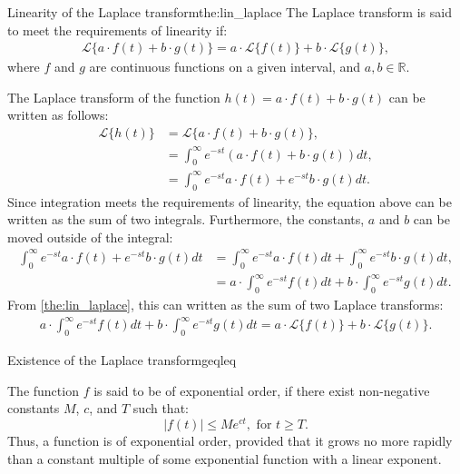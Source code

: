 \begin{theorem}{Linearity of the Laplace transform}{the:lin_laplace}
The Laplace transform is said to meet the requirements of linearity if:
\begin{align*}
\mathcal{L}\{a\cdot f(t)+b\cdot g(t)\}=a\cdot \mathcal{L}\{f(t)\}+b\cdot \mathcal{L}\{g(t)\},
\end{align*}
where $f$ and $g$ are continuous functions on a given interval, and $a, b \in \mathbb{R}$.
\end{theorem}
\begin{prof}{}{}
The Laplace transform of the function $h(t)=a\cdot f(t)+ b \cdot g(t)$ can be written as follows:
\begin{align*}
\mathcal{L}\{h(t)\}&=\mathcal{L}\{a\cdot f(t)+b\cdot g(t)\},
\\
&=\int_{0}^\infty e^{-st}\left(a\cdot f(t)+b\cdot g(t)\right)dt,
\\
&=\int_{0}^\infty e^{-st}a\cdot f(t)+e^{-st}b\cdot g(t)dt.
\end{align*}
Since integration meets the requirements of linearity, the equation above can be written as the sum of two integrals. Furthermore, the constants, $a$ and $b$ can be moved outside of the integral:
\begin{align*}
\int_{0}^\infty e^{-st}a\cdot f(t)+e^{-st}b\cdot g(t)dt &=\int_{0}^\infty e^{-st}a\cdot f(t)dt+\int_{0}^\infty e^{-st}b\cdot g(t)dt,
\\
&= a\cdot \int_{0}^\infty e^{-st} f(t)dt+ b \cdot \int_{0}^\infty e^{-st} g(t)dt.
\end{align*}
From \cref{the:lin_laplace}, this can written as the sum of two Laplace transforms:
\begin{align*}
a\cdot \int_{0}^\infty e^{-st} f(t)dt+ b \cdot \int_{0}^\infty e^{-st} g(t)dt =a\cdot \mathcal{L}\{f(t)\}+b\cdot \mathcal{L}\{g(t)\}.
\end{align*}
\end{prof}
\begin{theorem}{Existence of the Laplace transform}{geqleq}

The function $f$ is said to be of exponential order, if there exist non-negative constants $M$, $c$, and $T$  such that: $$|f(t)| \leq Me^{ct},    \text{   for } t \geq T.$$
Thus, a function is of exponential order, provided that it grows no more rapidly than a constant multiple of some exponential function with a linear exponent. \cite[p.~320]{diffandcomplex}
\end{theorem}

